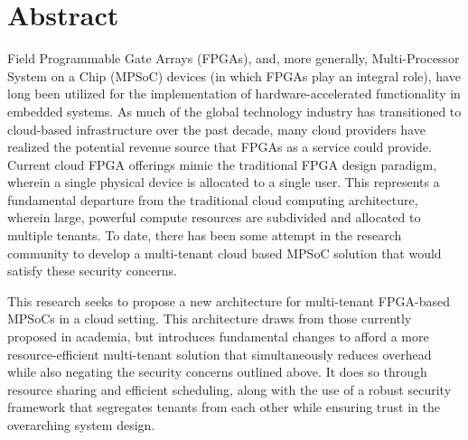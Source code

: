 
\pagestyle{empty}
\chapter{Abstract}\label{ch:abstract}

Field Programmable Gate Arrays (FPGAs), and, more generally, Multi-Processor System on a Chip (MPSoC) devices (in which FPGAs play an integral role), have long been utilized for the implementation of hardware-accelerated functionality in embedded systems. As much of the global technology industry has transitioned to cloud-based infrastructure over the past decade, many cloud providers have realized the potential revenue source that FPGAs as a service could provide. Current cloud FPGA offerings mimic the traditional FPGA design paradigm, wherein a single physical device is allocated to a single user. This represents a fundamental departure from the traditional cloud computing architecture, wherein large, powerful compute resources are subdivided and allocated to multiple tenants. To date, there has been some attempt in the research community to develop a multi-tenant cloud based MPSoC solution that would satisfy these security concerns. 


This research seeks to propose a new architecture for multi-tenant FPGA-based MPSoCs in a cloud setting. This architecture draws from those currently proposed in academia, but introduces fundamental changes to afford a more resource-efficient multi-tenant solution that simultaneously reduces overhead while also negating the security concerns outlined above. It does so through resource sharing and efficient scheduling, along with the use of a robust security framework that segregates tenants from each other while ensuring trust in the overarching system design.

